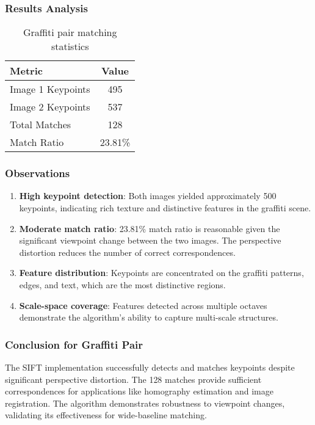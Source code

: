 \documentclass[12pt,a4paper]{article}
\begin{document}
\subsubsection{Results Analysis}
\begin{table}[H]
\centering
\begin{tabular}{@{}lc@{}}
\toprule
\textbf{Metric} & \textbf{Value} \\
\midrule
Image 1 Keypoints & 495 \\
Image 2 Keypoints & 537 \\
Total Matches & 128 \\
Match Ratio & 23.81\% \\
\bottomrule
\end{tabular}
\caption{Graffiti pair matching statistics}
\end{table}

\subsubsection{Observations}
\begin{enumerate}
    \item \textbf{High keypoint detection}: Both images yielded approximately 500 keypoints, indicating rich texture and distinctive features in the graffiti scene.
    
    \item \textbf{Moderate match ratio}: 23.81\% match ratio is reasonable given the significant viewpoint change between the two images. The perspective distortion reduces the number of correct correspondences.
    
    \item \textbf{Feature distribution}: Keypoints are concentrated on the graffiti patterns, edges, and text, which are the most distinctive regions.
    
    \item \textbf{Scale-space coverage}: Features detected across multiple octaves demonstrate the algorithm's ability to capture multi-scale structures.
\end{enumerate}

\subsubsection{Conclusion for Graffiti Pair}
The SIFT implementation successfully detects and matches keypoints despite significant perspective distortion. The 128 matches provide sufficient correspondences for applications like homography estimation and image registration. The algorithm demonstrates robustness to viewpoint changes, validating its effectiveness for wide-baseline matching.
\end{document}
